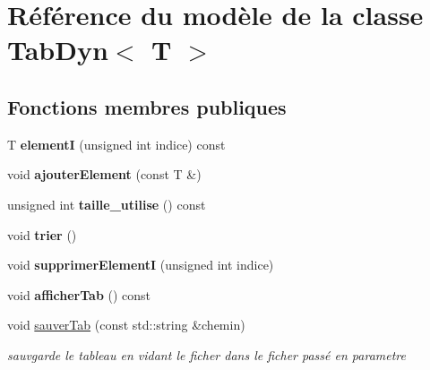 \hypertarget{class_tab_dyn}{}\section{Référence du modèle de la classe Tab\+Dyn$<$ T $>$}
\label{class_tab_dyn}
\subsection*{Fonctions membres publiques}
\begin{DoxyCompactItemize}
\item 
\mbox{\label{class_tab_dyn_a24d80afe7593c82ec106d43684a2d188}} 
T {\bfseries elementI} (unsigned int indice) const
\item 
\mbox{\label{class_tab_dyn_a30c1fe4f663161624e1138821c847b90}} 
void {\bfseries ajouter\+Element} (const T \&)
\item 
\mbox{\label{class_tab_dyn_a61cd5aeb1186bd7e37d5777e2d24e9e3}} 
unsigned int {\bfseries taille\+\_\+utilise} () const
\item 
\mbox{\label{class_tab_dyn_a554b655e742b69653de45da760941474}} 
void {\bfseries trier} ()
\item 
\mbox{\label{class_tab_dyn_a0bc6df9417462c573617d6b09a048426}} 
void {\bfseries supprimer\+ElementI} (unsigned int indice)
\item 
\mbox{\label{class_tab_dyn_a383e37b33119227258564ccd052ffe74}} 
void {\bfseries afficher\+Tab} () const
\item 
\mbox{\label{class_tab_dyn_ad76fed652f27c5833c78db659abc291c}} 
void \mbox{\hyperlink{class_tab_dyn_ad76fed652f27c5833c78db659abc291c}{sauver\+Tab}} (const std\+::string \&chemin)
\begin{DoxyCompactList}\small\item\em sauvgarde le tableau en vidant le ficher dans le ficher passé en parametre \end{DoxyCompactList}\item 
\mbox{\label{class_tab_dyn_a0691ddc682fa501ce7dbd0a7d1f9e261}} 

\end{DoxyCompactItemize}

